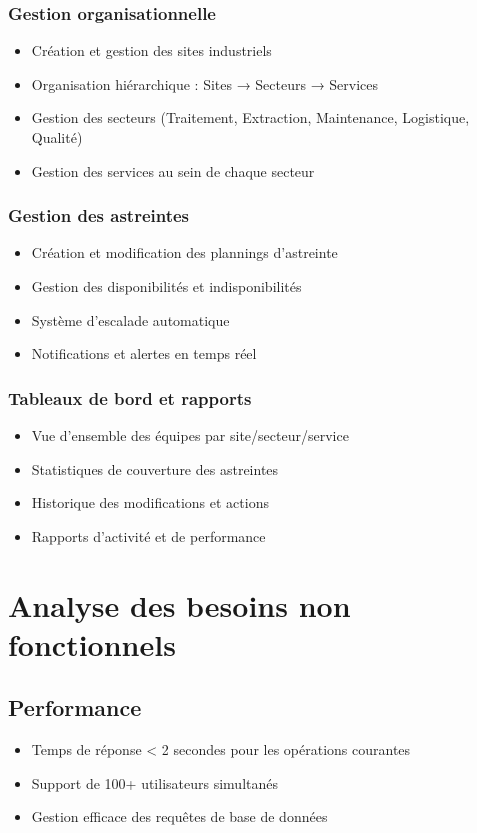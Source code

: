 \subsubsection{Gestion organisationnelle}
\begin{itemize}
    \item Création et gestion des sites industriels
    \item Organisation hiérarchique : Sites → Secteurs → Services
    \item Gestion des secteurs (Traitement, Extraction, Maintenance, Logistique, Qualité)
    \item Gestion des services au sein de chaque secteur
\end{itemize}

\subsubsection{Gestion des astreintes}
\begin{itemize}
    \item Création et modification des plannings d'astreinte
    \item Gestion des disponibilités et indisponibilités
    \item Système d'escalade automatique
    \item Notifications et alertes en temps réel
\end{itemize}

\subsubsection{Tableaux de bord et rapports}
\begin{itemize}
    \item Vue d'ensemble des équipes par site/secteur/service
    \item Statistiques de couverture des astreintes
    \item Historique des modifications et actions
    \item Rapports d'activité et de performance
\end{itemize}

\section{Analyse des besoins non fonctionnels}
\subsection{Performance}
\begin{itemize}
    \item Temps de réponse < 2 secondes pour les opérations courantes
    \item Support de 100+ utilisateurs simultanés
    \item Gestion efficace des requêtes de base de données
\end{itemize}

